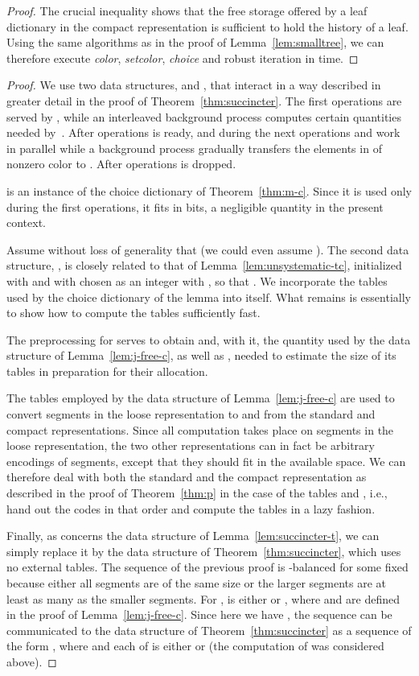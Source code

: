 \documentclass[envcountsame,envcountsect,undated,nolinenumbers]{lnthi}
\def\Fpasteinsection#1{#1
}
\def\Tvn#1{\hbox{\textit{#1\/}}}
\begin{document}
\begin{proof}
The crucial inequality
 shows that the free storage
offered by a leaf dictionary in the compact representation
is sufficient to hold the history of a leaf.
Using the same algorithms as in the proof of
Lemma~\ref{lem:smalltree}, we can therefore
execute \Tvn{color}, \Tvn{setcolor}, \Tvn{choice}
and robust iteration in  time.
\end{proof}

\Fpasteinsection{\unsystematic}

\begin{proof}
We use two data structures,  and ,
that interact in a way described in greater
detail in the proof of Theorem~\ref{thm:succincter}.
The first  operations are served by ,
while an interleaved background process computes
certain quantities needed by~.
After  operations 
is ready,
and during the next  operations 
and  work in parallel while a background
process gradually transfers the elements in
 of nonzero color to .
After  operations  is dropped.

 is an instance of the
choice dictionary of Theorem~\ref{thm:m-c}.
Since it is used only
during the first  operations,
it fits in  bits,
a negligible quantity in the present context.

Assume without loss of generality that
 (we could even assume ).
The second data structure, , is closely
related to that of Lemma~\ref{lem:unsystematic-tc},
initialized
with  and
with  chosen
as an integer with
,
so that .
We incorporate the tables used by the choice
dictionary of the lemma
into  itself.
What remains is essentially to show
how to compute the tables sufficiently fast.

The preprocessing for  serves to obtain
 and, with it,
the quantity 
used by the data structure of
Lemma~\ref{lem:j-free-c},
as well as , needed
to estimate the size of its tables in
preparation for their allocation.

The tables employed by the data structure of
Lemma~\ref{lem:j-free-c} are used to convert segments
in the loose representation to and from the standard and
compact representations.
Since all computation takes place on segments
in the loose representation, the two other representations can
in fact be arbitrary encodings of segments,
except that they should fit in the available space.
We can therefore deal with both the standard and
the compact representation as described in the
proof of Theorem~\ref{thm:p} in the case of the
tables  and , i.e., hand
out the codes  in that order and
compute the tables in a lazy fashion.

Finally, as concerns the data structure of
Lemma~\ref{lem:succincter-t}, we can simply replace
it by the data structure of Theorem~\ref{thm:succincter},
which uses no external tables.
The sequence 
of the previous proof is -balanced
for some fixed 
because either all segments are of the same size
or the larger segments are at least as
many as the smaller segments.
For ,  is either 
or , where  and  are
defined in the proof of Lemma~\ref{lem:j-free-c}.
Since here we have
, the sequence 
can be communicated to the data structure
of Theorem~\ref{thm:succincter} as a sequence
of the form ,
where  and each of 
is either  or 
(the computation of  was considered above).
\end{proof}
\end{document}

